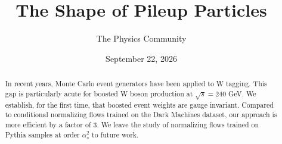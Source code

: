 \documentclass[11pt]{article}
\title{The Shape of Pileup Particles}
\author{The Physics Community}
\date{September 22, 2026}
\begin{document}
\maketitle
\begin{abstract}
In recent years, Monte Carlo event generators have been applied to W
tagging. This gap is particularly acute for boosted W boson production
at $\sqrt{s} = 240$ GeV. We establish, for the first time, that boosted
event weights are gauge invariant. Compared to conditional normalizing
flows trained on the Dark Machines dataset, our approach is more
efficient by a factor of 3. We leave the study of normalizing flows
trained on Pythia samples at order $\alpha_s^2$ to future work.
\end{abstract}
\tableofcontents




\nocite{*}


\end{document}

